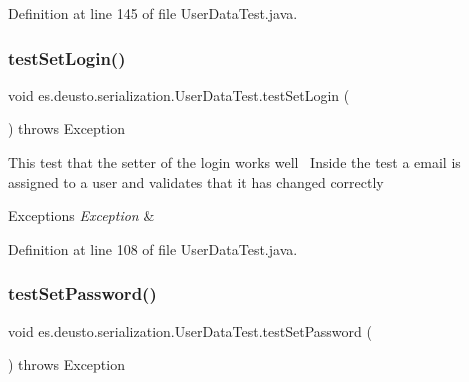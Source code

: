 Definition at line 145 of file User\+Data\+Test.\+java.

\mbox{\label{classes_1_1deusto_1_1serialization_1_1_user_data_test_a3311a4ff455e3d78280ec5da51a01998}} 
\subsubsection{\texorpdfstring{test\+Set\+Login()}{testSetLogin()}}
{\footnotesize\ttfamily void es.\+deusto.\+serialization.\+User\+Data\+Test.\+test\+Set\+Login (\begin{DoxyParamCaption}{ }\end{DoxyParamCaption}) throws Exception}

This test that the setter of the login works well~\newline
Inside the test a email is assigned to a user and validates that it has changed correctly~\newline

\begin{DoxyExceptions}{Exceptions}
{\em Exception} & \\
\hline
\end{DoxyExceptions}


Definition at line 108 of file User\+Data\+Test.\+java.

\mbox{\label{classes_1_1deusto_1_1serialization_1_1_user_data_test_aad240f31ab64b02d0121e4e594185767}} 
\subsubsection{\texorpdfstring{test\+Set\+Password()}{testSetPassword()}}
{\footnotesize\ttfamily void es.\+deusto.\+serialization.\+User\+Data\+Test.\+test\+Set\+Password (\begin{DoxyParamCaption}{ }\end{DoxyParamCaption}) throws Exception}

